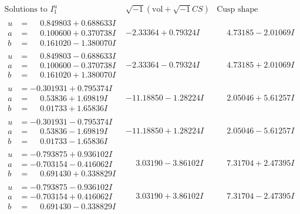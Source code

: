 \documentclass[1p]{elsarticle_modified}
\theoremstyle{definition}
\newcommand{\I}{\sqrt{-1}}
\begin{document}
$$\begin{array}{c|c|c}  
\text{Solutions to }I^u_{1}& \I (\text{vol} + \sqrt{-1}CS) & \text{Cusp shape}\\
 \hline 
\begin{aligned}
u &= \phantom{-}0.849803 + 0.688633 I \\
a &= \phantom{-}0.100600 + 0.370738 I \\
b &= \phantom{-}0.161020 - 1.380070 I\end{aligned}
 & -2.33364 + 0.79324 I & \phantom{-}4.73185 - 2.01069 I \\ \hline\begin{aligned}
u &= \phantom{-}0.849803 - 0.688633 I \\
a &= \phantom{-}0.100600 - 0.370738 I \\
b &= \phantom{-}0.161020 + 1.380070 I\end{aligned}
 & -2.33364 - 0.79324 I & \phantom{-}4.73185 + 2.01069 I \\ \hline\begin{aligned}
u &= -0.301931 + 0.795374 I \\
a &= \phantom{-}0.53836 + 1.69819 I \\
b &= \phantom{-}0.01733 + 1.65836 I\end{aligned}
 & -11.18850 - 1.28224 I & \phantom{-}2.05046 + 5.61257 I \\ \hline\begin{aligned}
u &= -0.301931 - 0.795374 I \\
a &= \phantom{-}0.53836 - 1.69819 I \\
b &= \phantom{-}0.01733 - 1.65836 I\end{aligned}
 & -11.18850 + 1.28224 I & \phantom{-}2.05046 - 5.61257 I \\ \hline\begin{aligned}
u &= -0.793875 + 0.936102 I \\
a &= -0.703154 - 0.416062 I \\
b &= \phantom{-}0.691430 + 0.338829 I\end{aligned}
 & \phantom{-}3.03190 - 3.86102 I & \phantom{-}7.31704 + 2.47395 I \\ \hline\begin{aligned}
u &= -0.793875 - 0.936102 I \\
a &= -0.703154 + 0.416062 I \\
b &= \phantom{-}0.691430 - 0.338829 I\end{aligned}
 & \phantom{-}3.03190 + 3.86102 I & \phantom{-}7.31704 - 2.47395 I \\ \hline\begin{aligned}

\end{aligned}
\end{array}$$
\end{document}
